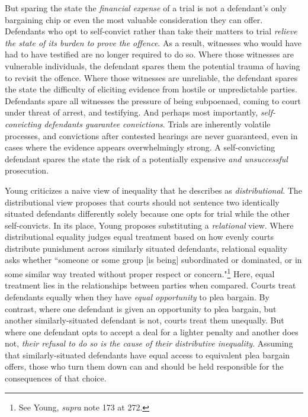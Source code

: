 But sparing the state the \textit{financial expense} of a trial is not a defendant's only bargaining chip or even the most valuable consideration they can offer. Defendants who opt to self-convict rather than take their matters to trial \textit{relieve the state of its burden to prove the offence}. As a result, witnesses who would have had to have testified are no longer required to do so. Where those witnesses are vulnerable individuals, the defendant spares them the potential trauma of having to revisit the offence. Where those witnesses are unreliable, the defendant spares the state the difficulty of eliciting evidence from hostile or unpredictable parties. Defendants spare all witnesses the pressure of being subpoenaed, coming to court under threat of arrest, and testifying. And perhaps most importantly, \textit{self-convicting defendants guarantee convictions}. Trials are inherently volatile processes, and convictions after contested hearings are never guaranteed, even in cases where the evidence appears overwhelmingly strong. A self-convicting defendant spares the state the risk of a potentially expensive \textit{and unsuccessful} prosecution.

Young criticizes a naive view of inequality that he describes as \textit{distributional}. The distributional view proposes that courts should not sentence two identically situated defendants differently solely because one opts for trial while the other self-convicts. In its place, Young proposes substituting a \textit{relational} view. Where distributional equality judges equal treatment based on how evenly courts distribute punishment across similarly situated defendants, relational equality asks whether ``someone or some group [is being] subordinated or dominated, or in some similar way treated without proper respect or concern."\footnote{See Young, \textit{supra} note 173 at 272.} Here, equal treatment lies in the relationships between parties when compared. Courts treat defendants equally when they have \textit{equal opportunity} to plea bargain. By contrast, where one defendant is given an opportunity to plea bargain, but another similarly-situated defendant is not, courts treat them unequally. But where one defendant opts to accept a deal for a lighter penalty and another does not, \textit{their refusal to do so is the cause of their distributive inequality}. Assuming that similarly-situated defendants have equal access to equivalent plea bargain offers, those who turn them down can and should be held responsible for the consequences of that choice.

